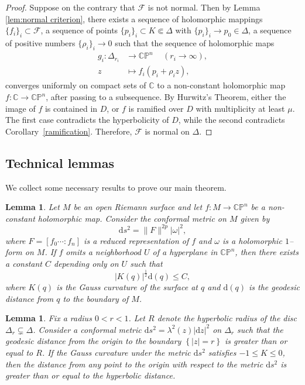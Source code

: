 \documentclass[english, 12pt]{amsart}
\theoremstyle{plain}
\newtheorem{lem}[thm]{{Lemma}}
\theoremstyle{remark}
\numberwithin{equation}{section}
\theoremstyle{plain}
\theoremstyle{named}
\begin{document}
\begin{proof}
	Suppose on the contrary that $\mathcal{F}$ is not normal. Then by Lemma \ref{lem:normal criterion}, there exists a sequence of holomorphic mappings $\{f_i\}_i\subset\mathcal{F}$, a sequence of points $\{p_i\}_i\subset K\Subset \Delta$ with $\{p_i\}_i\to p_0\in \Delta$, a sequence of positive numbers $\{\rho_i\}_i\to 0$ such that the sequence of holomorphic maps
	\begin{align*}
		g_i\colon \Delta_{r_i}&\rightarrow\mathbb{CP}^n\,\quad (r_i\rightarrow\infty),\\
		z&\mapsto f_i(p_i+\rho_iz),
	\end{align*}
	converges uniformly on compact sets of $\mathbb{C}$ to a non-constant holomorphic map $f\colon \mathbb{C}\rightarrow\mathbb{CP}^n$, after passing to a subsequence. By Hurwitz's Theorem, either the image of $f$ is contained in $D$, or $f$ is ramified over $D$ with multiplicity at least $\mu$. The first case contradicts the hyperbolicity of $D$, while the second contradicts Corollary~\ref{ramification}. Therefore, $\mathcal{F}$ is normal on $\Delta$.
\end{proof}
\subsection{Technical lemmas}
We collect some necessary results to prove our main theorem.
\begin{lem}{\cite[Theorem 3]{Chen-Li-Liu-Ru21}}
	\label{curvature estimate, g omits neigh. of hyperplane}
	Let $M$ be an open Riemann surface and let $f\colon M\rightarrow\mathbb{CP}^n$ be a non-constant holomorphic map. Consider the conformal metric on $M$ given by
	\[
	\mathrm{d}s^2=\|F\|^{2p}|\omega|^2,
	\]
	where $F=[f_0\cdots:f_n]$ is a reduced representation of $f$ and $\omega$ is a holomorphic $1$--form on $M$. If $f$ omits a neighborhood $U$ of a hyperplane in $\mathbb{CP}^n$, then there exists a constant $C$ depending only on $U$ such that
	\[
	|K(q)|^{\frac{1}{2}}\mathrm{d}(q)\leq C,
	\]
	where $K(q)$ is the Gauss curvature of the surface at $q$ and $\mathrm{d}(q)$ is the geodesic distance from $q$ to the boundary of $M$.
\end{lem}

\begin{lem}\cite[Lemma 2.1]{Osserman-Ru97}
	\label{compare with the hyperbolic distance} Fix a radius $0<r<1$. Let $R$ denote the hyperbolic radius of the disc $\Delta_r\subsetneq \Delta$. Consider a conformal metric $\mathrm{d}s^2=\lambda^2(z)|\mathrm{d}z|^2$  on $\Delta_r$ such that the geodesic distance from the origin to the boundary $\left\{|z|=r\right\}$ is greater than or equal to $R$. If the Gauss curvature under the metric $\mathrm{d}s^2$ satisfies $-1\leq K\leq 0$, then the distance from any point to the origin with respect to the metric $\mathrm{d}s^2$ is greater than or equal to the hyperbolic distance.
\end{lem}
\end{document}
